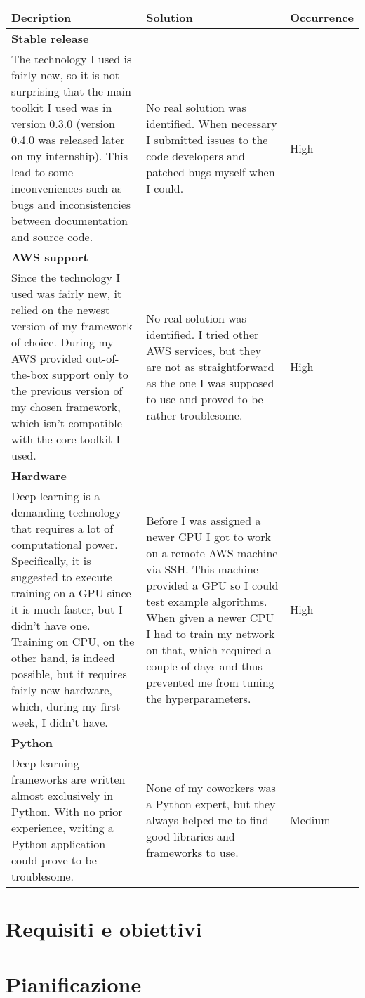 \begin{center}
    \begin{tabular}{ | p{5cm} | p{5cm} | p{2cm} |}
    \hline
    \textbf{Decription} & \textbf{Solution} & \textbf{Occurrence} \\ \hline
    \textbf{Stable release} \\ The technology I used is fairly new, so it is not surprising that the main toolkit I used was in version 0.3.0 (version 0.4.0 was released later on my internship). This lead to some inconveniences such as bugs and inconsistencies between documentation and source code. & No real solution was identified. When necessary I submitted issues to the code developers and patched bugs myself when I could. & High \\ \hline
    \textbf{AWS support}\\ Since the technology I used was fairly new, it relied on the newest version of my framework of choice. During my AWS provided out-of-the-box support only to the previous version of my chosen framework, which isn't compatible with the core toolkit I used. & No real solution was identified. I tried other AWS services, but they are not as straightforward as the one I was supposed to use and proved to be rather troublesome. & High \\ \hline
    \textbf{Hardware} \\ Deep learning is a demanding technology that requires a lot of computational power. Specifically, it is suggested to execute training on a GPU since it is much faster, but I didn't have one. Training on CPU, on the other hand, is indeed possible, but it requires fairly new hardware, which, during my first week, I didn't have. & Before I was assigned a newer CPU I got to work on a remote AWS machine via SSH. This machine provided a GPU so I could test example algorithms. When given a newer CPU I had to train my network on that, which required a couple of days and thus prevented me from tuning the hyperparameters. & High \\ \hline
   \textbf{Python} \\ Deep learning frameworks are written almost exclusively in Python. With no prior experience, writing a Python application could prove to be troublesome. & None of my coworkers was a Python expert, but they always helped me to find good libraries and frameworks to use. & Medium \\ \hline
   \end{tabular}
\end{center}


\section{Requisiti e obiettivi}


\section{Pianificazione}